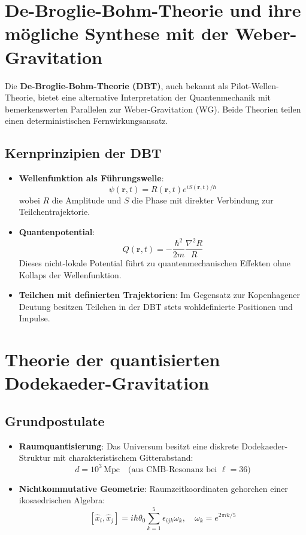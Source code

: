 \section{De-Broglie-Bohm-Theorie und ihre mögliche Synthese mit der Weber-Gravitation}
\label{sec:bohm}

Die \textbf{De-Broglie-Bohm-Theorie (DBT)}, auch bekannt als Pilot-Wellen-Theorie, bietet eine alternative Interpretation der Quantenmechanik mit bemerkenswerten Parallelen zur Weber-Gravitation (WG). Beide Theorien teilen einen deterministischen Fernwirkungsansatz.

\subsection{Kernprinzipien der DBT}
\begin{itemize}
    \item \textbf{Wellenfunktion als Führungswelle}: 
    \[
    \psi(\mathbf{r},t) = R(\mathbf{r},t)e^{iS(\mathbf{r},t)/\hbar}
    \]
    wobei $R$ die Amplitude und $S$ die Phase mit direkter Verbindung zur Teilchentrajektorie.

    \item \textbf{Quantenpotential}: 
    \[
    Q(\mathbf{r},t) = -\frac{\hbar^2}{2m}\frac{\nabla^2 R}{R}
    \]
    Dieses nicht-lokale Potential führt zu quantenmechanischen Effekten ohne Kollaps der Wellenfunktion.

    \item \textbf{Teilchen mit definierten Trajektorien}: Im Gegensatz zur Kopenhagener Deutung besitzen Teilchen in der DBT stets wohldefinierte Positionen und Impulse.
\end{itemize}

\section{Theorie der quantisierten Dodekaeder-Gravitation}
\label{sec:dodekaeder_theorie}

\subsection{Grundpostulate}
\begin{itemize}
    \item \textbf{Raumquantisierung}: Das Universum besitzt eine diskrete Dodekaeder-Struktur mit charakteristischem Gitterabstand:
    \[
    d = 10^3\,\text{Mpc} \quad \text{(aus CMB-Resonanz bei $\ell=36$)}
    \]
    
    \item \textbf{Nichtkommutative Geometrie}: Raumzeitkoordinaten gehorchen einer ikosaedrischen Algebra:
    \[
    [\hat{x}_i, \hat{x}_j] = i\hbar\theta_0\sum_{k=1}^5\epsilon_{ijk}\omega_k, \quad \omega_k = e^{2\pi ik/5}
    \]
\end{itemize}

